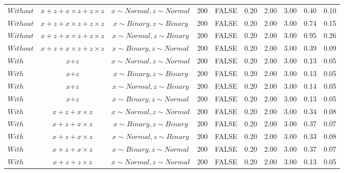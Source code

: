 \begin{longtable}{lccccccccc}
  $Without$ & $\textit{x} + \textit{z} + \textit{x} \times \textit{z} + \textit{z} \times \textit{z}$ & $\textit{x} \sim Normal , \textit{z} \sim Normal$ & 200 & FALSE & 0.20 & 2.00 & 3.00 & 0.40 & 0.10 \\ 
  $Without$ & $\textit{x} + \textit{z} + \textit{x} \times \textit{z} + \textit{z} \times \textit{z}$ & $\textit{x} \sim Binary, \textit{z} \sim Binary$ & 200 & FALSE & 0.20 & 2.00 & 3.00 & 0.74 & 0.15 \\ 
  $Without$ & $\textit{x} + \textit{z} + \textit{x} \times \textit{z} + \textit{z} \times \textit{z}$ & $\textit{x} \sim Normal, \textit{z} \sim Binary$ & 200 & FALSE & 0.20 & 2.00 & 3.00 & 0.95 & 0.26 \\ 
  $Without$ & $\textit{x} + \textit{z} + \textit{x} \times \textit{z} + \textit{z} \times \textit{z}$ & $\textit{x} \sim Binary, \textit{z} \sim Normal$ & 200 & FALSE & 0.20 & 2.00 & 3.00 & 0.39 & 0.09 \\ 
  $With$ & $\textit{x} + \textit{z}$ & $\textit{x} \sim Normal , \textit{z} \sim Normal$ & 200 & FALSE & 0.20 & 2.00 & 3.00 & 0.13 & 0.05 \\ 
  $With$ & $\textit{x} + \textit{z}$ & $\textit{x} \sim Binary, \textit{z} \sim Binary$ & 200 & FALSE & 0.20 & 2.00 & 3.00 & 0.13 & 0.05 \\ 
  $With$ & $\textit{x} + \textit{z}$ & $\textit{x} \sim Normal, \textit{z} \sim Binary$ & 200 & FALSE & 0.20 & 2.00 & 3.00 & 0.14 & 0.05 \\ 
  $With$ & $\textit{x} + \textit{z}$ & $\textit{x} \sim Binary, \textit{z} \sim Normal$ & 200 & FALSE & 0.20 & 2.00 & 3.00 & 0.13 & 0.05 \\ 
  $With$ & $\textit{x} + \textit{z} + \textit{x} \times \textit{z}$ & $\textit{x} \sim Normal , \textit{z} \sim Normal$ & 200 & FALSE & 0.20 & 2.00 & 3.00 & 0.34 & 0.08 \\ 
  $With$ & $\textit{x} + \textit{z} + \textit{x} \times \textit{z}$ & $\textit{x} \sim Binary, \textit{z} \sim Binary$ & 200 & FALSE & 0.20 & 2.00 & 3.00 & 0.37 & 0.07 \\ 
  $With$ & $\textit{x} + \textit{z} + \textit{x} \times \textit{z}$ & $\textit{x} \sim Normal, \textit{z} \sim Binary$ & 200 & FALSE & 0.20 & 2.00 & 3.00 & 0.33 & 0.08 \\ 
  $With$ & $\textit{x} + \textit{z} + \textit{x} \times \textit{z}$ & $\textit{x} \sim Binary, \textit{z} \sim Normal$ & 200 & FALSE & 0.20 & 2.00 & 3.00 & 0.37 & 0.07 \\ 
  $With$ & $\textit{x} + \textit{z} + \textit{z} \times \textit{z}$ & $\textit{x} \sim Normal , \textit{z} \sim Normal$ & 200 & FALSE & 0.20 & 2.00 & 3.00 & 0.13 & 0.05 \\ 

\end{longtable}
